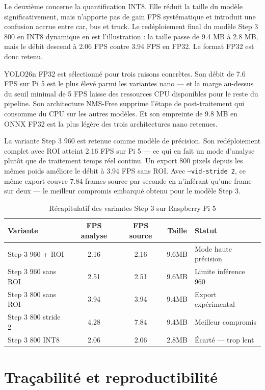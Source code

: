 Le deuxième concerne la quantification
INT8. Elle réduit la taille du modèle
significativement, mais n'apporte pas
de gain FPS systématique et introduit
une confusion accrue entre car, bus et
truck. Le redéploiement final du modèle
Step 3 800 en INT8 dynamique en est
l'illustration : la taille passe de
9.4 MB à 2.8 MB, mais le débit descend
à 2.06 FPS contre 3.94 FPS en FP32.
Le format FP32 est donc retenu.

YOLO26n FP32 est sélectionné pour trois
raisons concrètes. Son débit de 7.6 FPS
sur Pi 5 est le plus élevé parmi les
variantes nano — et la marge au-dessus
du seuil minimal de 5 FPS laisse des
ressources CPU disponibles pour le reste
du pipeline. Son architecture NMS-Free
supprime l'étape de post-traitement qui
consomme du CPU sur les autres modèles.
Et son empreinte de 9.8 MB en ONNX FP32
est la plus légère des trois architectures
nano retenues.

La variante Step 3 960 est retenue comme
modèle de précision. Son redéploiement
complet avec ROI atteint 2.16 FPS sur Pi 5
— ce qui en fait un mode d'analyse plutôt
que de traitement temps réel continu.
Un export 800 pixels depuis les mêmes poids
améliore le débit à 3.94 FPS sans ROI.
Avec \texttt{--vid-stride 2}, ce même
export couvre 7.84 frames source par
seconde en n'inférant qu'une frame sur deux
— le meilleur compromis embarqué obtenu
pour le modèle Step 3.

\begin{table}[H]
\centering
\caption{Récapitulatif des variantes
         Step 3 sur Raspberry Pi 5}
\small
\begin{tabularx}{\textwidth}{Xcccl}
\toprule
\textbf{Variante} &
\textbf{FPS analyse} &
\textbf{FPS source} &
\textbf{Taille} &
\textbf{Statut} \\
\midrule
Step 3 960 + ROI &
2.16 & 2.16 & 9.6MB &
Mode haute précision \\
Step 3 960 sans ROI &
2.51 & 2.51 & 9.6MB &
Limite inférence 960 \\
Step 3 800 sans ROI &
3.94 & 3.94 & 9.4MB &
Export expérimental \\
Step 3 800 stride 2 &
4.28 & 7.84 & 9.4MB &
Meilleur compromis \\
Step 3 800 INT8 &
2.06 & 2.06 & 2.8MB &
Écarté — trop lent \\
\bottomrule
\end{tabularx}
\label{tab:step3_rpi5}
\end{table}

\section{Traçabilité et reproductibilité}

